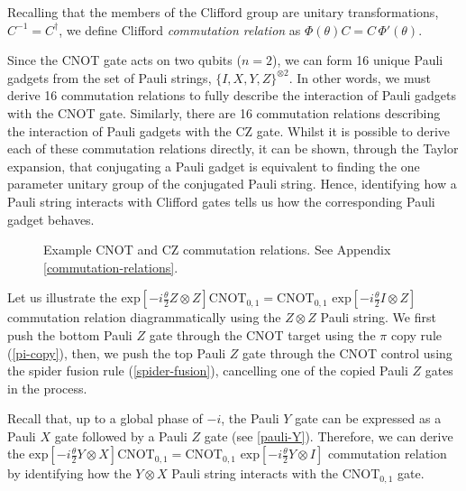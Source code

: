 
Recalling that the members of the Clifford group are unitary transformations, $C^{-1} = C^\dagger$, we define Clifford \textit{commutation relation} as $\Phi(\theta) C = C \, \Phi'(\theta)$.


Since the CNOT gate acts on two qubits ($n=2$), we can form 16 unique Pauli gadgets from the set of Pauli strings, $\{I, X, Y, Z\}^{\otimes 2}$. In other words, we must derive 16 commutation relations to fully describe the interaction of Pauli gadgets with the CNOT gate. Similarly, there are 16 commutation relations describing the interaction of Pauli gadgets with the CZ gate. Whilst it is possible to derive each of these commutation relations directly, it can be shown, through the Taylor expansion, that conjugating a Pauli gadget is equivalent to finding the one parameter unitary group of the conjugated Pauli string. Hence, identifying how a Pauli string interacts with Clifford gates tells us how the corresponding Pauli gadget behaves.

\begin{figure}[H]
    \centering
    \caption{Example CNOT and CZ commutation relations. See Appendix \ref{commutation-relations}.}
\end{figure}

Let us illustrate the $\text{exp} \left[ - i\frac{\theta}{2} Z \otimes Z \right] \text{CNOT}_{0, 1} = \text{CNOT}_{0, 1} \,\, \text{exp} \left[ - i\frac{\theta}{2} I \otimes Z \right]$ commutation relation diagrammatically using the $Z \otimes Z$ Pauli string. We first push the bottom Pauli $Z$ gate through the CNOT target using the $\pi$ copy rule (\ref{pi-copy}), then, we push the top Pauli $Z$ gate through the CNOT control using the spider fusion rule (\ref{spider-fusion}), cancelling one of the copied Pauli $Z$ gates in the process.


Recall that, up to a global phase of $-i$, the Pauli $Y$ gate can be expressed as a Pauli $X$ gate followed by a Pauli $Z$ gate (see \ref{pauli-Y}). Therefore, we can derive the $\text{exp} \left[ - i\frac{\theta}{2} Y \otimes X \right] \text{CNOT}_{0, 1} = \text{CNOT}_{0, 1} \,\, \text{exp} \left[ - i\frac{\theta}{2} Y \otimes I \right]$ commutation relation by identifying how the $Y \otimes X$ Pauli string interacts with the CNOT$_{0, 1}$ gate.

